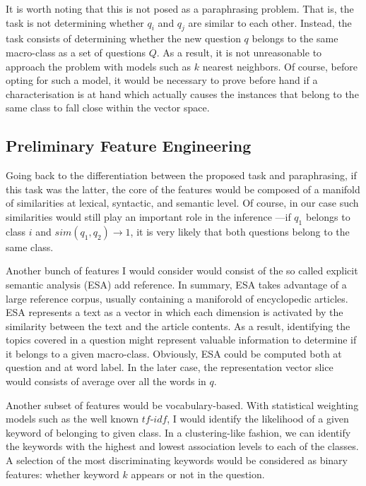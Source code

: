 \documentclass{sig-alternate-05-2015}
\newcommand{\abc}[1]{{\color{red} #1}}
\begin{document}
It is worth noting that this is not posed as a paraphrasing problem. That is, 
the task is not determining whether $q_i$ and $q_j$ are similar to each 
other. Instead, the task consists of determining whether the new question $q$ 
belongs to the same macro-class as a set of questions $Q$. As a result, it 
is not unreasonable to approach the problem with models such as $k$ nearest 
neighbors. Of course, before opting for such a model, it would be necessary 
to prove before hand if a characterisation is at hand which actually causes 
the instances that belong to the same class to fall close within the vector 
space. 

\subsection{Preliminary Feature Engineering}

Going back to the differentiation between the proposed task and paraphrasing, 
if this task was the latter, the core of the features would be composed of a 
manifold of similarities at lexical, syntactic, and semantic level. Of course, 
in our case such similarities would still play an important role in the 
inference ---if $q_1$ belongs to class $i$ and $sim(q_1,q_2)\rightarrow 1$, it 
is very likely that both questions belong to the same class. 

Another bunch of features I would consider would consist of the so called 
explicit semantic analysis (ESA)\abc{add reference}. In summary, ESA takes 
advantage of a large reference corpus, usually containing a maniforold of 
encyclopedic articles. ESA represents a text as a vector in which each dimension 
is activated by the similarity between the text and the article contents. As a 
result, identifying the topics covered in a question might represent valuable 
information to determine if it belongs to a given macro-class. Obviously, ESA 
could be computed both at question and at word label. In the later case, the 
representation vector slice would consists of average over all the words in $q$.

Another subset of features would be vocabulary-based. With statistical weighting 
models such as the well known $tf$-$idf$, I would identify the likelihood of a 
given keyword of belonging to given class. In a clustering-like fashion, we can 
identify the keywords with the highest and lowest association levels to each of 
the classes. A selection of the most discriminating keywords would be considered 
as binary features: whether keyword $k$ appears or not in the question. 
\end{document}
